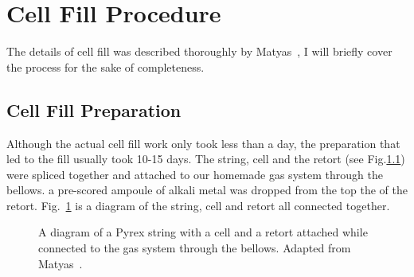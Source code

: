 \section{Cell Fill Procedure}

The details of cell fill was described thoroughly by Matyas~\cite{DanThesis}, I will briefly cover the process for the sake of completeness.

\subsection{Cell Fill Preparation}

Although the actual cell fill work only took less than a day, the preparation that led to the fill usually took 10-15 days. The string, cell and the retort (see Fig.\ref{}) were spliced together and attached to our homemade gas system through the bellows. a pre-scored ampoule of alkali metal was dropped from the top the of the retort.  Fig.~\ref{cell_gas_system} is a diagram of the string, cell and retort all connected together. 

\begin{figure}[t!]
	\centering
	\caption{{A diagram of a Pyrex string with a cell and a retort attached while connected to the gas system through the bellows. Adapted from Matyas~\cite{DanThesis}.}}
	\label{cell_gas_system}
\end{figure}


